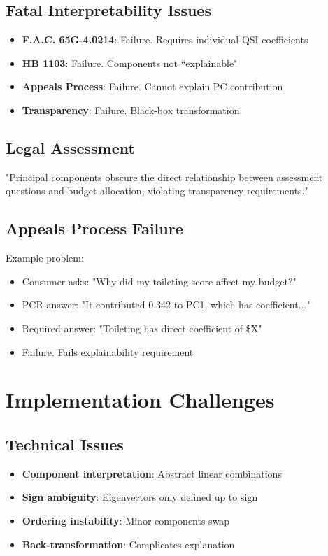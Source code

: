 \subsection{Fatal Interpretability Issues}

\begin{itemize}
    \item \textbf{F.A.C. 65G-4.0214}: Failure.  Requires individual QSI coefficients
    \item \textbf{HB 1103}: Failure.  Components not ``explainable"
    \item \textbf{Appeals Process}: Failure.  Cannot explain PC contribution
    \item \textbf{Transparency}: Failure.  Black-box transformation
\end{itemize}

\subsection{Legal Assessment}

"Principal components obscure the direct relationship between assessment questions and budget allocation, violating transparency requirements."

\subsection{Appeals Process Failure}

Example problem:
\begin{itemize}
    \item Consumer asks: "Why did my toileting score affect my budget?"
    \item PCR answer: "It contributed 0.342 to PC1, which has coefficient..."
    \item Required answer: "Toileting has direct coefficient of \$X"
    \item Failure.  Fails explainability requirement
\end{itemize}

\section{Implementation Challenges}

\subsection{Technical Issues}

\begin{itemize}
    \item \textbf{Component interpretation}: Abstract linear combinations
    \item \textbf{Sign ambiguity}: Eigenvectors only defined up to sign
    \item \textbf{Ordering instability}: Minor components swap
    \item \textbf{Back-transformation}: Complicates explanation
\end{itemize}

